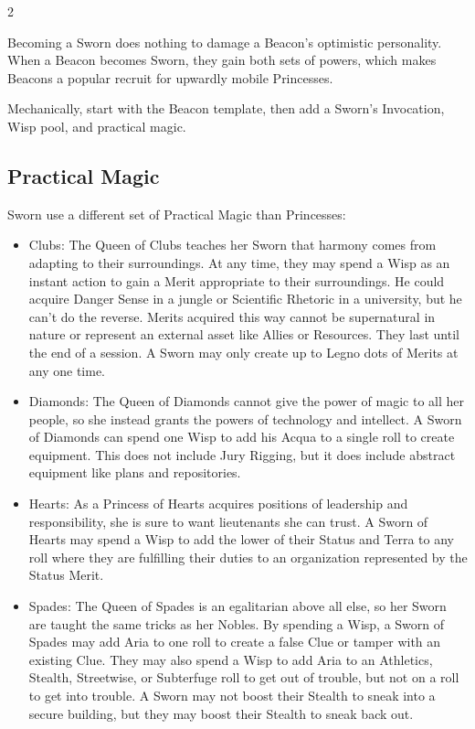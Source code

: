\begin{multicols}{2}
\begin{mybox}
Becoming a Sworn does nothing to damage a Beacon's optimistic personality. When a Beacon becomes Sworn, they gain both sets of powers, which makes Beacons a popular recruit for upwardly mobile Princesses. 

Mechanically, start with the Beacon template, then add a Sworn's Invocation, Wisp pool, and practical magic. 

\end{mybox}


\subsection*{Practical Magic}

Sworn use a different set of Practical Magic than Princesses: 

\begin{itemize}
\item Clubs: The Queen of Clubs teaches her Sworn that harmony comes from adapting to their surroundings. At any time, they may spend a Wisp as an instant action to gain a Merit appropriate to their surroundings. He could acquire Danger Sense in a jungle or Scientific Rhetoric in a university, but he can't do the reverse. Merits acquired this way cannot be supernatural in nature or represent an external asset like Allies or Resources. They last until the end of a session. A Sworn may only create up to Legno dots of Merits at any one time. 
\item Diamonds: The Queen of Diamonds cannot give the power of magic to all her people, so she instead grants the powers of technology and intellect. A Sworn of Diamonds can spend one Wisp to add his Acqua to a single roll to create equipment. This does not include Jury Rigging, but it does include abstract equipment like plans and repositories.
\item Hearts: As a Princess of Hearts acquires positions of leadership and responsibility, she is sure to want lieutenants she can trust. A Sworn of Hearts may spend a Wisp to add the lower of their Status and Terra to any roll where they are fulfilling their duties to an organization represented by the Status Merit. 
\item Spades: The Queen of Spades is an egalitarian above all else, so her Sworn are taught the same tricks as her Nobles. By spending a Wisp, a Sworn of Spades may add Aria to one roll to create a false Clue or tamper with an existing Clue. They may also spend a Wisp to add Aria to an Athletics, Stealth, Streetwise, or Subterfuge roll to get out of trouble, but not on a roll to get into trouble. A Sworn may not boost their Stealth to sneak into a secure building, but they may boost their Stealth to sneak back out. 

\end{itemize}
\end{multicols}
